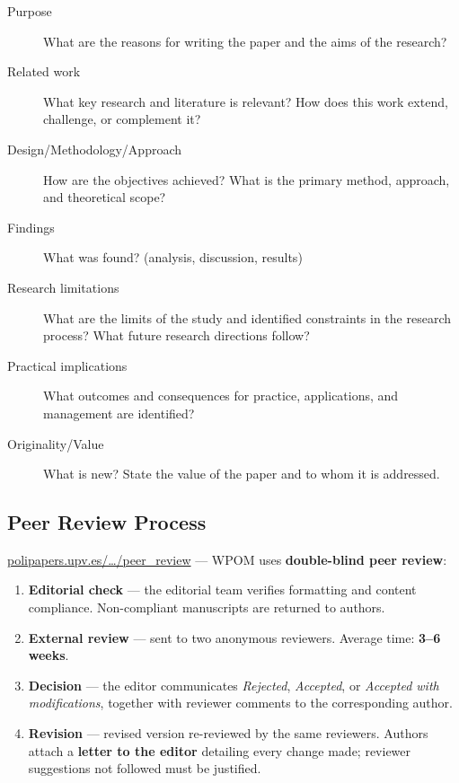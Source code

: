 \documentclass{wpom-upv}
\begin{document}
\begin{description}
  \item[Purpose] What are the reasons for writing the paper and the
    aims of the research?
  \item[Related work] What key research and literature is relevant?
    How does this work extend, challenge, or complement it?
  \item[Design/Methodology/Approach] How are the objectives achieved?
    What is the primary method, approach, and theoretical scope?
  \item[Findings] What was found? (analysis, discussion, results)
  \item[Research limitations] What are the limits of the study and
    identified constraints in the research process? What future
    research directions follow?
  \item[Practical implications] What outcomes and consequences for
    practice, applications, and management are identified?
  \item[Originality/Value] What is new? State the value of the paper
    and to whom it is addressed.
\end{description}

\subsection{Peer Review Process}

\href{https://polipapers.upv.es/index.php/WPOM/peer_review}{polipapers.upv.es/…/peer\_review}
— WPOM uses \textbf{double-blind peer review}:

\begin{enumerate}
  \item \textbf{Editorial check} — the editorial team verifies
    formatting and content compliance. Non-compliant manuscripts are
    returned to authors.
  \item \textbf{External review} — sent to two anonymous reviewers.
    Average time: \textbf{3--6 weeks}.
  \item \textbf{Decision} — the editor communicates
    \textit{Rejected}, \textit{Accepted}, or
    \textit{Accepted with modifications}, together with reviewer
    comments to the corresponding author.
  \item \textbf{Revision} — revised version re-reviewed by the same
    reviewers. Authors attach a \textbf{letter to the editor}
    detailing every change made; reviewer suggestions not followed
    must be justified.
\end{enumerate}
\end{document}
